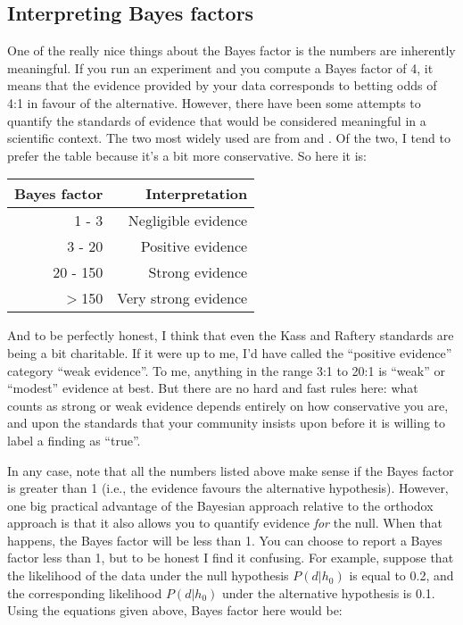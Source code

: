 \subsection{Interpreting Bayes factors}

One of the really nice things about the Bayes factor is the numbers are inherently meaningful. If you run an experiment and you compute a Bayes factor of 4, it means that the evidence provided by your data corresponds to betting odds of 4:1 in favour of the alternative. However, there have been some attempts to quantify the standards of evidence that would be considered meaningful in a scientific context. The two most widely used are from \textcite{Jeffreys1961} and \textcite{Kass1995}. Of the two, I tend to prefer the \textcite{Kass1995} table because it's a bit more conservative. So here it is:

\begin{center}
\begin{tabular}{r|r}
Bayes factor & Interpretation \\ \hline
1 - 3 & Negligible evidence \\
3 - 20 & Positive evidence \\
20 - 150 & Strong evidence \\
$>$150 & Very strong evidence
\end{tabular}
\end{center} 

\noindent
And to be perfectly honest, I think that even the Kass and Raftery standards are being a bit charitable. If it were up to me, I'd have called the ``positive evidence'' category ``weak evidence''. To me, anything in the range 3:1 to 20:1 is ``weak'' or ``modest'' evidence at best. But there are no hard and fast rules here: what counts as strong or weak evidence depends entirely on how conservative you are, and upon the standards that your community insists upon before it is willing to label a finding as ``true''. 

In any case, note that all the numbers listed above make sense if the Bayes factor is greater than 1 (i.e., the evidence favours the alternative hypothesis). However, one big practical advantage of the Bayesian approach relative to the orthodox approach is that it also allows you to quantify evidence {\it for} the null. When that happens, the Bayes factor will be less than 1. You can choose to report a Bayes factor less than 1, but to be honest I find it confusing. For example, suppose that the likelihood of the data under the null hypothesis $P(d|h_0)$ is equal to 0.2, and the corresponding likelihood $P(d|h_0)$ under the alternative hypothesis is 0.1. Using the equations given above,  Bayes factor here would be:

